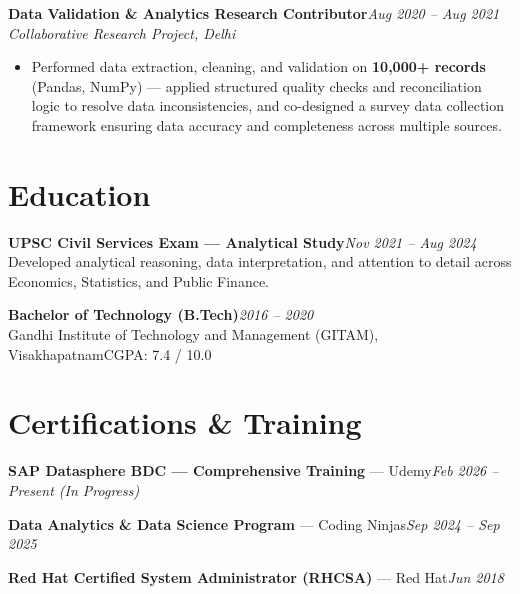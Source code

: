 \documentclass[10pt, letterpaper]{article}
\newcommand{\role}[3]{%
  \vspace{2pt}%
  {\bfseries #1}\hfill{\small\color{muted}\textit{#3}}\\[-2pt]%
  {\small\color{muted}\textit{#2}}%
}
\begin{document}
\role{Data Validation \& Analytics Research Contributor}{Collaborative Research Project, Delhi}{Aug 2020 – Aug 2021}

\begin{itemize}
  \item Performed data extraction, cleaning, and validation on \textbf{10,000+ records} (Pandas, NumPy) — applied structured quality checks and reconciliation logic to resolve data inconsistencies, and co-designed a survey data collection framework ensuring data accuracy and completeness across multiple sources.
\end{itemize}


\section{Education}

{\bfseries UPSC Civil Services Exam — Analytical Study}\hfill{\small\color{muted}\textit{Nov 2021 – Aug 2024}}\\
{\small\color{muted}Developed analytical reasoning, data interpretation, and attention to detail across Economics, Statistics, and Public Finance.}

\vspace{2pt}
{\bfseries Bachelor of Technology (B.Tech)}\hfill{\small\color{muted}\textit{2016 – 2020}}\\
{\small\color{muted}Gandhi Institute of Technology and Management (GITAM), Visakhapatnam\hfill CGPA: 7.4 / 10.0}

\section{Certifications \& Training}

{\bfseries SAP Datasphere BDC — Comprehensive Training} — Udemy\hfill{\small\color{muted}\textit{Feb 2026 – Present \emph{(In Progress)}}}

\vspace{1pt}
{\bfseries Data Analytics \& Data Science Program} — Coding Ninjas\hfill{\small\color{muted}\textit{Sep 2024 – Sep 2025}}

\vspace{1pt}
{\bfseries Red Hat Certified System Administrator (RHCSA)} — Red Hat\hfill{\small\color{muted}\textit{Jun 2018}}

\end{document}
